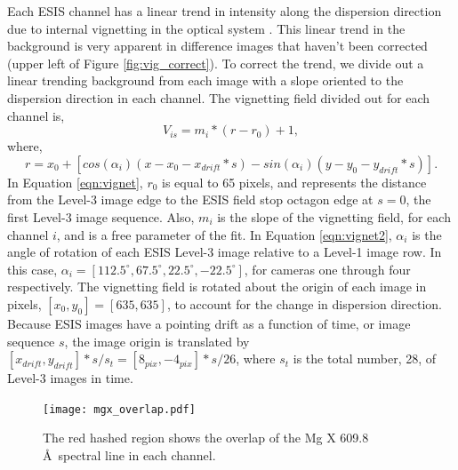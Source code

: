         Each ESIS channel has a linear trend in intensity along the dispersion direction due to internal vignetting in the optical system \citep{ESIS}.
        This linear trend in the background is very apparent in difference images that haven't been corrected (upper left of Figure \ref{fig:vig_correct}).
        To correct the trend, we divide out a linear trending background from each image with a slope oriented to the dispersion direction in each channel.
        The vignetting field divided out for each channel is,
        \begin{equation}
            V_{is} = m_{i} * (r - r_0) + 1,
            \label{eqn:vignet}
        \end{equation}
       	where,
       	\begin{equation}
        	r = x_0 + [cos(\alpha_i)(x-x_0-x_{drift}*s) - sin(\alpha_i)(y-y_0-y_{drift}*s)].
        	\label{eqn:vignet2}
       	\end{equation}
       	In Equation \ref{eqn:vignet}, $r_0$ is equal to 65 pixels, and represents the distance from the Level-3 image edge to the ESIS field stop octagon edge at $s = 0$, the first Level-3 image sequence.
       	Also, $m_{i}$ is the slope of the vignetting field, for each channel $i$, and is a free parameter of the fit.
        In Equation \ref{eqn:vignet2},  $\alpha_i$ is the angle of rotation of each ESIS Level-3 image relative to a Level-1 image row.
        In this case, $\alpha_i = [112.5^{\circ}, 67.5^{\circ}, 22.5^{\circ}, -22.5^{\circ}]$, for cameras one through four respectively.
        The vignetting field is rotated about the origin of each image in pixels, $[x_0, y_0] = [635,635]$, to account for the change in dispersion direction.
        Because ESIS images have a pointing drift as a function of time, or image sequence $s$, the image origin is translated by $[x_{drift},y_{drift}]*s/s_t = [8_{pix},-4_{pix}]*s/26$, where $s_t $ is the total number, 28, of Level-3 images in time.
        
        \begin{figure}[htb!]
        	\centering
        	\texttt{[image: mgx\_overlap.pdf]}
        	\caption{The red hashed region shows the overlap of the Mg X 609.8 \AA \ spectral line in each channel.}
        	\label{fig:mgx_overlap}
        \end{figure}
        
